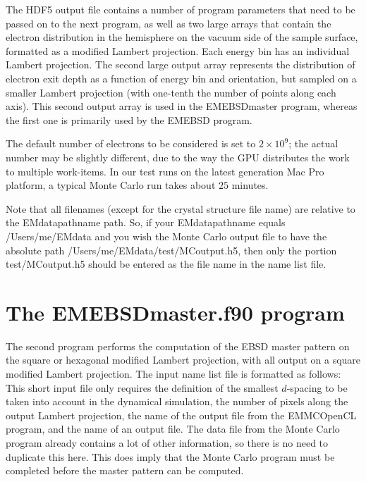 \documentclass[DIV=calc, paper=letter, fontsize=11pt]{scrartcl}	 %
\begin{document}
The HDF5 output file contains a number of program parameters
that need to be passed on to the next program, as well as two large arrays that contain the electron distribution in the hemisphere on
the vacuum side of the sample surface, formatted as a modified Lambert projection.  Each energy bin has an individual Lambert 
projection.  The second large output array represents the distribution of electron exit depth as a function of energy bin and
orientation, but sampled on a smaller Lambert projection (with one-tenth the number of points along each axis).  This second output
array is used in the \textsf{EMEBSDmaster} program, whereas the first one is primarily used by the \textsf{EMEBSD} program.

The default number of electrons to be considered is set to $2\times 10^9$; the actual number may be slightly different, due 
to the way the GPU distributes the work to multiple work-items.  In our test runs on the latest generation Mac Pro platform, 
a typical Monte Carlo run takes about $25$ minutes.

Note that all filenames (except for the crystal structure file name) are relative to the \textsf{EMdatapathname} path.  So, if your 
\textsf{EMdatapathname} equals \textsf{/Users/me/EMdata} and you wish the Monte Carlo output file to have the absolute path
\textsf{/Users/me/EMdata/test/MCoutput.h5}, then only the portion \textsf{test/MCoutput.h5} should be entered as the file name
in the name list file.

\newpage
\section{The \protect\textsf{EMEBSDmaster.f90} program\label{sec:f90EBSDmaster}}
The second program performs the computation of the EBSD master pattern on the
square or hexagonal modified Lambert projection, with all output on a square modified Lambert projection.
The input name list file is formatted as follows:
This short input file only requires the definition of the smallest $d$-spacing to be taken into account 
in the dynamical simulation, the number of pixels along the output Lambert projection, the name of the 
output file from the \textsf{EMMCOpenCL} program, and the name of an output file.  The data file from
the Monte Carlo program already contains a lot of other information, so there is no need to duplicate 
this here.  This does imply that the Monte Carlo program must be completed before the 
master pattern can be computed.
\end{document}
